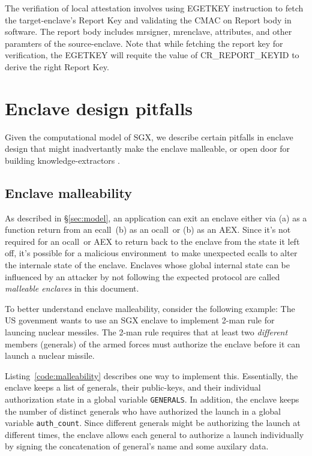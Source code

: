 \documentclass[10pt]{article}
\newcommand{\secref}[1]{\S\ref{#1}}
\newcommand{\ecall}{\textsf{ecall}}
\newcommand{\ocall}{\textsf{ocall}}
\newcommand{\env}{\textsf{environment}}
\newcommand{\mrenclave}{\textsf{mrenclave}}
\newcommand{\mrsigner}{\textsf{mrsigner}}
\newcommand{\se}{source-enclave}
\newcommand{\te}{target-enclave}
\begin{document}
  The verifiation of local attestation involves using \textsf{EGETKEY}
  instruction to fetch the \te's Report Key and validating the
  \textsf{CMAC} on Report body in software.  The report body includes
  \mrsigner, \mrenclave, attributes, and other paramters of the
  \se. Note that while fetching the report key for verification, the
  \textsf{EGETKEY} will requite the value of
  \textsf{CR\_REPORT\_KEYID} to derive the right Report Key.

  \section{Enclave design pitfalls}
  \label{sec:analysisfwk}

  Given the computational model of SGX, we describe certain pitfalls
  in enclave design that might inadvertantly make the enclave
  malleable, or open door for building knowledge-extractors
  \cite{BellarePOK}.

  \subsection{Enclave malleability}
  \label{ssec:malleability}
  As described in \secref{sec:model}, an application can exit an
  enclave either via (a) as a function return from an \ecall\ (b) as
  an \ocall\ or (b) as an AEX. Since it's not required for an
  \ocall\ or AEX to return back to the enclave from the state it left
  off, it's possible for a malicious \env\ to make unexpected \ecall s
  to alter the internale state of the enclave. Enclaves whose global
  internal state can be influenced by an attacker by not following the
  expected protocol are called \textit{malleable enclaves} in this
  document.

  To better understand enclave malleability, consider the following
  example: The US govenment wants to use an SGX enclave to implement
  2-man rule for launcing nuclear messiles. The 2-man rule requires
  that at least two \textit{different} members (generals) of the armed
  forces must authorize the enclave before it can launch a nuclear
  missile.

  Listing~\ref{code:malleability} describes one way to implement this.
  Essentially, the enclave keeps a list of generals, their
  public-keys, and their individual authorization state in a global
  variable \texttt{GENERALS}. In addition, the enclave keeps the
  number of distinct generals who have authorized the launch in a
  global variable \texttt{auth\_count}. Since different generals might
  be authorizing the launch at different times, the enclave allows
  each general to authorize a launch individually by signing the
  concatenation of general's name and some auxilary data.
\end{document}
